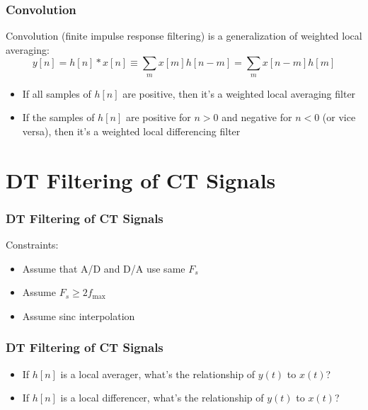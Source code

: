 \documentclass{beamer}
\begin{document}
\begin{frame}
  \frametitle{Convolution}

  Convolution (finite impulse response filtering) is a generalization of weighted local averaging:
  \begin{displaymath}
    y[n] = h[n]\ast x[n] \equiv \sum_m x[m] h[n-m] = \sum_m x[n-m] h[m]
  \end{displaymath}
  \begin{itemize}
  \item If all samples of $h[n]$ are positive, then it's a weighted
    local averaging filter
  \item If the samples of $h[n]$ are positive for $n>0$ and negative
    for $n<0$ (or vice versa), then it's a weighted local differencing
    filter
  \end{itemize}
\end{frame}

\section{DT Filtering of CT Signals}
\setcounter{subsection}{1}

\begin{frame}
  \frametitle{DT Filtering of CT Signals}
  \begin{center}
  \end{center}
  Constraints:
  \begin{itemize}
  \item Assume that A/D and D/A use same $F_s$
  \item Assume $F_s\ge 2f_{\text{max}}$
  \item Assume sinc interpolation
  \end{itemize}
\end{frame}

\begin{frame}
  \frametitle{DT Filtering of CT Signals}

  \begin{itemize}
  \item If $h[n]$ is a local averager, what's the relationship of $y(t)$ to $x(t)$?
  \item If $h[n]$ is a local differencer, what's the relationship of $y(t)$ to $x(t)$?
  \end{itemize}
\end{frame}
\end{document}
